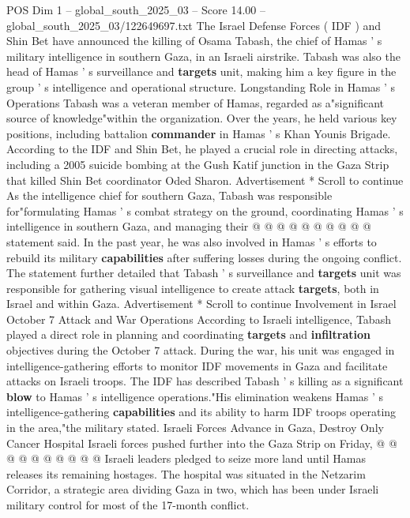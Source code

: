 \begin{textsample}{POS Dim 1 – global\_south\_2025\_03 – Score 14.00 – global\_south\_2025\_03/122649697.txt}  \label{ex:f1_pos_300}
The Israel Defense Forces ( IDF ) and Shin Bet have announced the killing of Osama Tabash, the chief of Hamas ' s military intelligence in southern Gaza, in an Israeli airstrike.
Tabash was also the head of Hamas ' s surveillance and \textbf{targets} unit, making him a key figure in the group ' s intelligence and operational structure.
Longstanding Role in Hamas ' s Operations Tabash was a veteran member of Hamas, regarded as a"significant source of knowledge"within the organization.
Over the years, he held various key positions, including battalion \textbf{commander} in Hamas ' s Khan Younis Brigade.
According to the IDF and Shin Bet, he played a crucial role in directing attacks, including a 2005 suicide bombing at the Gush Katif junction in the Gaza Strip that killed Shin Bet coordinator Oded Sharon.
Advertisement * Scroll to continue As the intelligence chief for southern Gaza, Tabash was responsible for"formulating Hamas ' s combat strategy on the ground, coordinating Hamas ' s intelligence in southern Gaza, and managing their @ @ @ @ @ @ @ @ @ @ statement said.
In the past year, he was also involved in Hamas ' s efforts to rebuild its military \textbf{capabilities} after suffering losses during the ongoing conflict.
The statement further detailed that Tabash ' s surveillance and \textbf{targets} unit was responsible for gathering visual intelligence to create attack \textbf{targets}, both in Israel and within Gaza.
Advertisement * Scroll to continue Involvement in Israel October 7 Attack and War Operations According to Israeli intelligence, Tabash played a direct role in planning and coordinating \textbf{targets} and \textbf{infiltration} objectives during the October 7 attack.
During the war, his unit was engaged in intelligence-gathering efforts to monitor IDF movements in Gaza and facilitate attacks on Israeli troops.
The IDF has described Tabash ' s killing as a significant \textbf{blow} to Hamas ' s intelligence operations."His elimination weakens Hamas ' s intelligence-gathering \textbf{capabilities} and its ability to harm IDF troops operating in the area,"the military stated.
Israeli Forces Advance in Gaza, Destroy Only Cancer Hospital Israeli forces pushed further into the Gaza Strip on Friday, @ @ @ @ @ @ @ @ @ @ Israeli leaders pledged to seize more land until Hamas releases its remaining hostages.
The hospital was situated in the Netzarim Corridor, a strategic area dividing Gaza in two, which has been under Israeli military control for most of the 17-month conflict.

\end{textsample}
